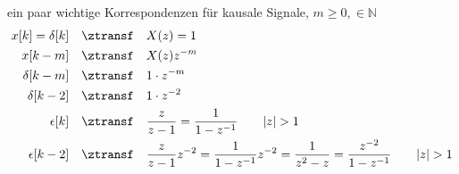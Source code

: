 \begin{Werkzeug}
ein paar wichtige Korrespondenzen für kausale Signale, $m\geq 0, \in\mathbb{N}$
\begin{align}
x[k] = \delta[k]  \quad\ztransf\quad& X(z) = 1\\
x[k-m]  \quad\ztransf\quad& X(z) z^{-m}\\
\delta[k-m]  \quad\ztransf\quad& 1 \cdot z^{-m}\\
\delta[k-2]  \quad\ztransf\quad& 1 \cdot z^{-2}\\
\epsilon[k] \quad\ztransf\quad& \frac{z}{z-1} = \frac{1}{1-z^{-1}}\qquad |z|>1\\
\epsilon[k-2] \quad\ztransf\quad& \frac{z}{z-1} z^{-2}= \frac{1}{1-z^{-1}} z^{-2} = \frac{1}{z^2-z} = \frac{z^{-2}}{1-z^{-1}} \qquad |z|>1
\end{align}
\end{Werkzeug}

